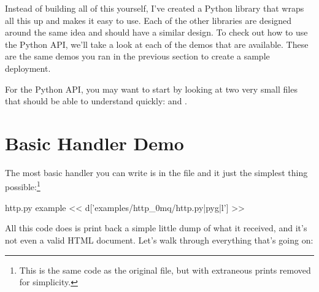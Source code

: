 Instead of building all of this yourself, I've created a Python library
that wraps all this up and makes it easy to use.  Each of the other
libraries are designed around the same idea and should have a similar
design.  To check out how to use the Python API, we'll take a look at
each of the demos that are available.  These are the same demos you
ran in the previous section to create a sample deployment.

For the Python API, you may want to start by looking at two very small files that should be able to understand quickly:
 and
.


\section{Basic Handler Demo}

The most basic handler you can write is in the  file
and it just the simplest thing possible:\footnote{This is the same code as the original
file, but with extraneous prints removed for simplicity.}

\begin{code}{http.py example}
 << d['examples/http_0mq/http.py|pyg|l'] >>
\end{code}

All this code does is print back a simple little dump of what it received, and
it's not even a valid HTML document.  Let's walk through everything that's going on:

